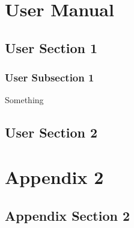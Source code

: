 \section{User Manual}
\subsection {User Section 1}
    \subsubsection {User Subsection 1}
    Something
    
\subsection {User Section 2}

\section{Appendix 2}

\subsection{Appendix Section 2}